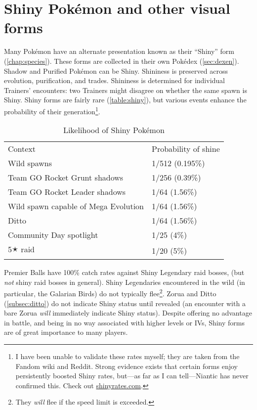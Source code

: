 \section{Shiny Pokémon and other visual forms\label{sec:shiny}}
Many Pokémon have an alternate presentation known as their ``Shiny'' form (\autoref{chap:species}).
These forms are collected in their own Pokédex (\autoref{sec:dexen}).
Shadow and Purified Pokémon can be Shiny.
Shininess is preserved across evolution, purification, and trades.
Shininess is determined for individual Trainers' encounters: two Trainers might disagree on whether the same spawn is Shiny.
Shiny forms are fairly rare (\autoref{table:shiny}), but various events
  enhance the probability of their generation\footnote{I have been unable to validate these rates myself; they are taken from the Fandom wiki and Reddit.
  Strong evidence exists that certain forms enjoy persistently boosted Shiny rates, but---as far as I can tell---Niantic
  has never confirmed this. Check out \href{https://shinyrates.com}{shinyrates.com}.}.
\begin{table}
\centering
\begin{tabular}{ll}
Context & Probability of shine \\
\Midrule
  Wild spawns & 1/512 (0.195\%) \\
  Team GO Rocket Grunt shadows & 1/256 (0.39\%) \\
  Team GO Rocket Leader shadows & 1/64 (1.56\%) \\
  Wild spawn capable of Mega Evolution & 1/64 (1.56\%)\\
  Ditto & 1/64 (1.56\%)\\
  Community Day spotlight & 1/25 (4\%)\\
  5🟉 raid & 1/20 (5\%) \\
\end{tabular}
  \caption{Likelihood of Shiny Pokémon\label{table:shiny}}
\end{table}
Premier Balls have 100\% catch rates against Shiny Legendary raid bosses, (but \textit{not} shiny raid bosses in general).
Shiny Legendaries encountered in the wild (in particular, the Galarian Birds) do not typically flee\footnote{They \textit{will} flee if the speed limit is exceeded.}.
Zorua and Ditto (\autoref{subsec:ditto}) do not indicate Shiny status until revealed (an encounter
  with a bare Zorua \textit{will} immediately indicate Shiny status).
Despite offering no advantage in battle, and being in no way associated with
  higher levels or IVs, Shiny forms are of great importance to many players.
